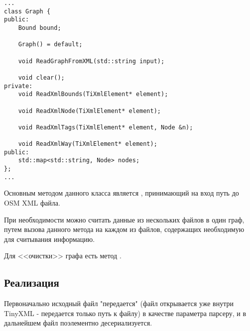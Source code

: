 \begin{lstlisting}[caption=class Graph (Graph.h), style=customcpp]
...
class Graph {
public:
    Bound bound;

    Graph() = default;

    void ReadGraphFromXML(std::string input);

    void clear();
private:
    void ReadXmlBounds(TiXmlElement* element);

    void ReadXmlNode(TiXmlElement* element);

    void ReadXmlTags(TiXmlElement* element, Node &n);

    void ReadXmlWay(TiXmlElement* element);
public:
    std::map<std::string, Node> nodes;
};
...
\end{lstlisting}
\par Основным методом данного класса является ,
принимающий на вход путь до OSM XML файла.
\par При необходимости можно считать данные из нескольких файлов в один граф,
путем вызова данного метода на каждом из файлов, содержащих необходимую для
считывания информацию.
\par Для <<очистки>> графа есть метод .

\subsection{Реализация}
\noindent\indent Первоначально исходный файл "передается" (файл открывается уже
внутри TinyXML - передается только путь к файлу) в качестве параметра парсеру, и
в дальнейшем файл поэлементно десериализуется.

